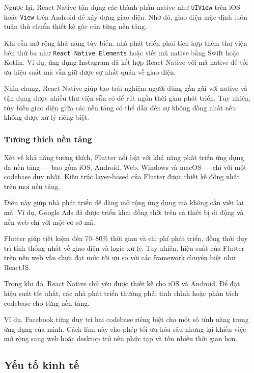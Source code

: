 \indent Ngược lại, React Native tận dụng các thành phần native như \texttt{UIView} trên iOS hoặc \texttt{View} trên Android để xây dựng giao diện. Nhờ đó, giao diện mặc định luôn tuân thủ chuẩn thiết kế gốc của từng nền tảng.

\indent Khi cần mở rộng khả năng tùy biến, nhà phát triển phải tích hợp thêm thư viện bên thứ ba như \texttt{React Native Elements} hoặc viết mã native bằng Swift hoặc Kotlin. Ví dụ, ứng dụng Instagram đã kết hợp React Native với mã native để tối ưu hiệu suất mà vẫn giữ được sự nhất quán về giao diện.

\indent Nhìn chung, React Native giúp tạo trải nghiệm người dùng gần gũi với native và tận dụng được nhiều thư viện sẵn có để rút ngắn thời gian phát triển. Tuy nhiên, tùy biến giao diện giữa các nền tảng có thể dẫn đến sự không đồng nhất nếu không được xử lý riêng biệt.

\subsubsection{Tương thích nền tảng}

\hspace*{1.3em} Xét về khả năng tương thích, Flutter nổi bật với khả năng phát triển ứng dụng đa nền tảng — bao gồm iOS, Android, Web, Windows và macOS — chỉ với một codebase duy nhất. Kiến trúc layer-based của Flutter được thiết kế đồng nhất trên mọi nền tảng.

\indent Điều này giúp nhà phát triển dễ dàng mở rộng ứng dụng mà không cần viết lại mã. Ví dụ, Google Ads đã được triển khai đồng thời trên cả thiết bị di động và nền web chỉ với một cơ sở mã.

\indent Flutter giúp tiết kiệm đến 70–80\% thời gian và chi phí phát triển, đồng thời duy trì tính thống nhất về giao diện và logic xử lý. Tuy nhiên, hiệu suất của Flutter trên nền web vẫn chưa đạt mức tối ưu so với các framework chuyên biệt như ReactJS.

\indent Trong khi đó, React Native chủ yếu được thiết kế cho iOS và Android. Để đạt hiệu suất tốt nhất, các nhà phát triển thường phải tinh chỉnh hoặc phân tách codebase cho từng nền tảng.

\indent Ví dụ, Facebook từng duy trì hai codebase riêng biệt cho một số tính năng trong ứng dụng của mình. Cách làm này cho phép tối ưu hóa sâu nhưng lại khiến việc mở rộng sang web hoặc desktop trở nên phức tạp và tốn nhiều thời gian hơn.



\subsection{Yếu tố kinh tế}

